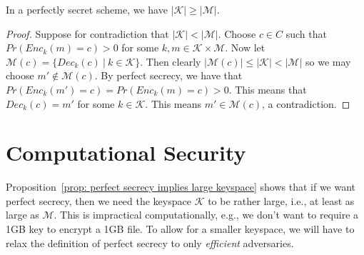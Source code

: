 \documentclass[twoside, a4paper, 10pt]{amsart}
\begin{document}
\begin{prop}\label{prop: perfect secrecy implies large keyspace} In a perfectly secret scheme, we have $|\mathcal{K}| \geq |\mathcal{M}|$.

\end{prop}

\begin{proof} Suppose for contradiction that $|\mathcal{K}| < |\mathcal{M}|$. Choose $c \in C$ such that $Pr(Enc_k(m) = c) > 0$ for some $k,m \in \mathcal{K} \times \mathcal{M}$. Now let $\mathcal{M}(c) = \{ Dec_k(c) ~|~ k \in \mathcal{K} \}$. Then clearly $|\mathcal{M}(c)| \leq |\mathcal{K}| < |\mathcal{M}|$ so we may choose $m' \notin \mathcal{M}(c)$. By perfect secrecy, we have that $Pr(Enc_k(m') = c) = Pr(Enc_k(m) = c) > 0$. This means that $Dec_k(c) = m'$ for some $k \in \mathcal{K}$. This means $m' \in \mathcal{M}(c)$, a contradiction.\end{proof}

\section{Computational Security}

Proposition~\ref{prop: perfect secrecy implies large keyspace} shows that if we want perfect secrecy, then we need the keyspace $\mathcal{K}$ to be rather large, i.e., at least as large as $\mathcal{M}$. This is impractical computationally, e.g., we don't want to require a 1GB key to encrypt a 1GB file. To allow for a smaller keyspace, we will have to relax the definition of perfect secrecy to only \textit{efficient} adversaries. 
\end{document}
